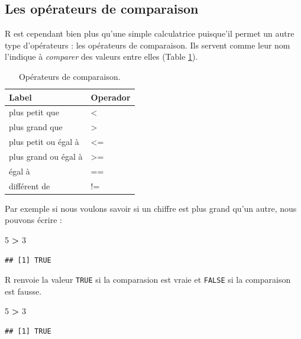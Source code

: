 \documentclass[]{book}
\newenvironment{Shaded}{\begin{snugshade}}{\end{snugshade}}
\newcommand{\DecValTok}[1]{\textcolor[rgb]{0.00,0.00,0.81}{#1}}
\newcommand{\StringTok}[1]{\textcolor[rgb]{0.31,0.60,0.02}{#1}}
\newcommand{\OperatorTok}[1]{\textcolor[rgb]{0.81,0.36,0.00}{\textbf{#1}}}
\begin{document}
\subsection{Les opérateurs de
comparaison}\label{les-operateurs-de-comparaison}

R est cependant bien plus qu'une simple calculatrice puisque'il permet
un autre type d'opérateurs : les opérateurs de comparaison. Ils servent
comme leur nom l'indique à \emph{comparer} des valeurs entre elles
(Table \ref{tab:tabOpCom}).

\begin{table}

\caption{\label{tab:tabOpCom}Opérateurs de comparaison.\label{tab:tabOpCom}}
\centering
\begin{tabular}[t]{l|l}
\hline
Label & Operador\\
\hline
plus petit que & <\\
\hline
plus grand que & >\\
\hline
plus petit ou égal à & <=\\
\hline
plus grand ou égal à & >=\\
\hline
égal à & ==\\
\hline
différent de & !=\\
\hline
\end{tabular}
\end{table}

Par exemple si nous voulons savoir si un chiffre est plus grand qu'un
autre, nous pouvons écrire :

\begin{Shaded}
\begin{Highlighting}[]
\DecValTok{5} \OperatorTok{>}\StringTok{ }\DecValTok{3} 
\end{Highlighting}
\end{Shaded}

\begin{verbatim}
## [1] TRUE
\end{verbatim}

R renvoie la valeur \texttt{TRUE} si la comparasion est vraie et
\texttt{FALSE} si la comparaison est fausse.

\begin{Shaded}
\begin{Highlighting}[]
\DecValTok{5} \OperatorTok{>}\StringTok{ }\DecValTok{3}
\end{Highlighting}
\end{Shaded}

\begin{verbatim}
## [1] TRUE
\end{verbatim}
\end{document}

